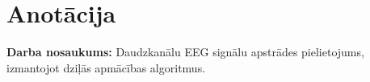 \documentclass[12pt,paper=A4]{report}
\def\defGads{2019}
\begin{document}

 		
    \tableofcontents
    \setcounter{page}{3}
    \thispagestyle{empty}
    \thispagestyle{empty}
    \onehalfspace
    
\chapter*{Anotācija}
\textbf{Darba nosaukums:} Daudzkanālu EEG signālu apstrādes pielietojums, izmantojot dziļās apmācības algoritmus.
\end{document}

